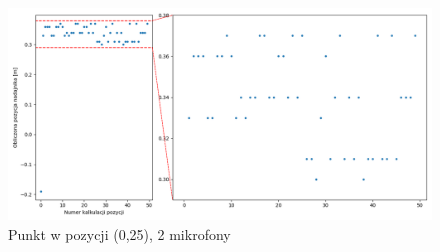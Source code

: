 \begin{frame}
    \begin{figure}
        \centering
        \includegraphics[width=\linewidth]{../pics/mult_lat_1d/position_[0.25]_2.png}
        \caption{Punkt w pozycji (0,25), 2 mikrofony}
    \end{figure}
\end{frame}
